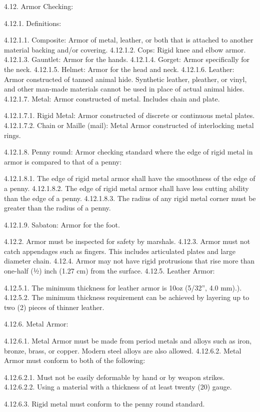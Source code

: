 \documentclass[12pt]{article}
\begin{document}
\begin{level}[start=0]
4.12. Armor Checking:

4.12.1. Definitions:

4.12.1.1. Composite: Armor of metal, leather, or both that is attached to another material backing and/or covering.
4.12.1.2. Cops: Rigid knee and elbow armor.
4.12.1.3. Gauntlet: Armor for the hands.
4.12.1.4. Gorget: Armor specifically for the neck.
4.12.1.5. Helmet: Armor for the head and neck.
4.12.1.6. Leather: Armor constructed of tanned animal hide. Synthetic leather, pleather, or vinyl, and other man-made materials cannot be used in place of actual animal hides.
4.12.1.7. Metal: Armor constructed of metal. Includes chain and plate.

4.12.1.7.1. Rigid Metal: Armor constructed of discrete or continuous metal plates.
4.12.1.7.2. Chain or Maille (mail): Metal Armor constructed of interlocking metal rings.

4.12.1.8. Penny round: Armor checking standard where the edge of rigid metal in armor is compared to that of a penny:

4.12.1.8.1. The edge of rigid metal armor shall have the smoothness of the edge of a penny.
4.12.1.8.2. The edge of rigid metal armor shall have less cutting ability than the edge of a penny.
4.12.1.8.3. The radius of any rigid metal corner must be greater than the radius of a penny.

4.12.1.9. Sabaton: Armor for the foot.

4.12.2. Armor must be inspected for safety by marshals.
4.12.3. Armor must not catch appendages such as fingers. This includes articulated plates and large diameter chain.
4.12.4. Armor may not have rigid protrusions that rise more than one-half (½) inch (1.27 cm) from the surface.
4.12.5. Leather Armor:

4.12.5.1. The minimum thickness for leather armor is 10oz (5/32'', 4.0 mm).).
4.12.5.2. The minimum thickness requirement can be achieved by layering up to two (2) pieces of thinner leather.

4.12.6. Metal Armor:

4.12.6.1. Metal Armor must be made from period metals and alloys such as iron, bronze, brass, or copper. Modern steel alloys are also allowed.
4.12.6.2. Metal Armor must conform to both of the following:

4.12.6.2.1. Must not be easily deformable by hand or by weapon strikes.
4.12.6.2.2. Using a material with a thickness of at least twenty (20) gauge.

4.12.6.3. Rigid metal must conform to the penny round standard.


\end{level}
\end{document}
